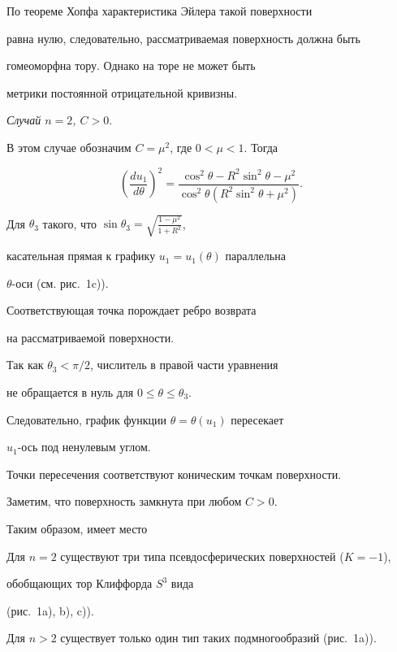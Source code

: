 По теореме Хопфа характеристика Эйлера такой поверхности


равна нулю, следовательно, рассматриваемая поверхность должна быть


гомеоморфна тору. Однако на торе не может быть


метрики постоянной отрицательной кривизны.


\medskip





{\it Случай $n=2$, $C>0$}.


В этом случае обозначим $C=\mu^2$, где $0<\mu<1$. Тогда


\begin{equation} \label{aa}


\left( \frac{d u_1}{d \theta} \right)^2 = 


\frac{\cos^2\theta - R^2 \sin^2\theta - \mu^2}{\cos^2\theta(R^2 \sin^2\theta


+\mu^2)}.


\end{equation}


Для $\theta_3$ такого, что $\sin\theta_3 = \sqrt{\frac{1-\mu^2}{1+R^2}}$,


касательная прямая к графику $u_1=u_1(\theta)$ параллельна 


$\theta$-оси (см. рис.~1c)).


Соответствующая точка порождает ребро возврата


на рассматриваемой поверхности. 


Так как $\theta_3 < \pi/2$, числитель в правой части уравнения


 не обращается в нуль для $0\leq \theta\leq \theta_3$.


Следовательно, график функции $\theta=\theta(u_1)$ пересекает


$u_1$-ось под ненулевым углом.


Точки пересечения соответствуют коническим точкам поверхности.


Заметим, что поверхность замкнута при любом $C>0$.


Таким образом, имеет место 





\begin{cor}


Для $n=2$ существуют три типа псевдосферических поверхностей ($K=-1$),


обобщающих тор Клиффорда $S^3$ вида 


(рис.~1a), b), c)).


Для $n>2$ существует только один тип таких подмногообразий (рис.~1a)).


\end{cor}





